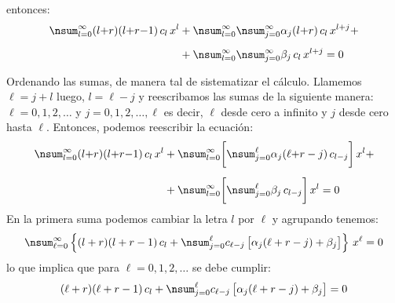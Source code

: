 entonces:
\begin{align*}
\nsum_{l=0}^{\infty} (l {+} r)(l {+} r {-} 1) \, c_{l} \, x^{l} &+ \nsum_{l=0}^{\infty} \nsum_{j=0}^{\infty} \alpha_{j} (l {+} r) \, c_{l} \, x^{l+j} + \\[0.5em]
&+ \nsum_{l=0}^{\infty} \nsum_{j=0}^{\infty} \beta_{j} \, c_{l} \, x^{l+j} = 0
\end{align*}

Ordenando las sumas, de manera tal de sistematizar el cálculo. Llamemos $\ell = j + l$ luego, $l = \ell - j$ y reescribamos las sumas de la siguiente manera: $\ell = 0, 1, 2,\ldots $ y $j = 0, 1, 2, \ldots, \ell$ es decir, $\ell$ desde cero a infinito y $j$ desde cero hasta $\ell$. Entonces, podemos reescribir la ecuación:
\begin{align*}
\nsum_{l=0}^{\infty} (l {+} r)(l {+} r {-} 1) \, c_{l} \, x^{l} &+ \nsum_{l=0}^{\infty} \bigg[ \nsum_{j=0}^{\ell} \alpha_{j} (\ell {+} r - j) \, c_{l-j} \bigg] \, x^{l} + \\[0.5em]
&+ \nsum_{l=0}^{\infty} \bigg[ \nsum_{j=0}^{\ell} \beta_{j} \, c_{l-j} \bigg] \, x^{l} = 0
\end{align*}
En la primera suma podemos cambiar la letra $l$ por $\ell$ y agrupando tenemos:
\begin{align*}
\nsum_{\ell=0}^{\infty} \left\{ (l + r)(l + r - 1) \, c_{l} + \nsum_{j=0}^{\ell} c_{\ell-j} \, \big[ \alpha_{j} (\ell + r - j) + \beta_{j} \big] \right\} \, x^{\ell} = 0
\end{align*}
lo que implica que para $\ell = 0, 1, 2, \ldots$ se debe cumplir:
\begin{align*}
(\ell + r)(\ell + r - 1) \, c_{l} + \nsum_{j=0}^{\ell} c_{\ell-j} \, \big[ \alpha_{j} (\ell + r - j) + \beta_{j} \big] = 0
\end{align*}

